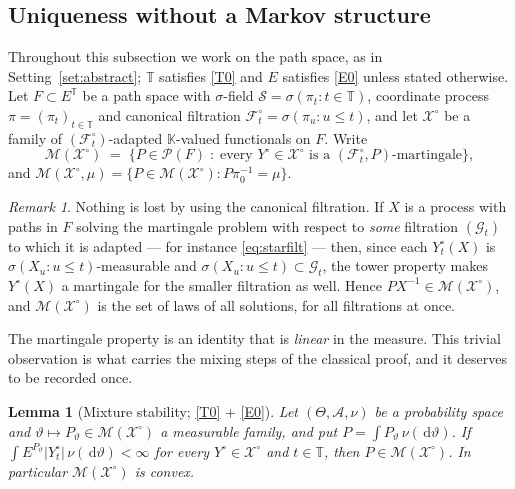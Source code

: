 \documentclass[11pt,a4paper]{article}
\theoremstyle{plain}
\newtheorem{lemma}[theorem]{Lemma}
\theoremstyle{definition}
\theoremstyle{remark}
\newtheorem{remark}[theorem]{Remark}
\newcommand{\T}{\mathbb{T}}                     %
\newcommand{\Prob}{\mathcal{P}}                %
\newcommand{\Filt}{\mathcal{F}}
\newcommand{\Gilt}{\mathcal{G}}
\newcommand{\K}{\mathbb{K}}
\newcommand{\XX}{\mathcal{X}}                  %
\newcommand{\Msol}{\mathcal{M}}
\newcommand{\dif}{\,\mathrm{d}}
\begin{document}
\subsection{Uniqueness without a Markov structure}
\label{ssec:absuniq}

Throughout this subsection we work on the path space, as in
Setting~\ref{set:abstract}; $\T$ satisfies \eqref{T0} and $E$ satisfies \eqref{E0} unless
stated otherwise.  Let $F \subset E^{\T}$ be a path space with $\sigma$-field
$\mathcal{S} = \sigma(\pi_t : t \in \T)$,
coordinate process $\pi = (\pi_t)_{t \in \T}$ and canonical filtration
$\Filt^\circ_t = \sigma(\pi_u : u \leq t)$, and let $\XX^\circ$ be a family of
$(\Filt^\circ_t)$-adapted $\K$-valued functionals on $F$.  Write
\[
  \Msol(\XX^\circ) \;=\; \bigl\{ P \in \Prob(F) \;:\;
    \text{every } Y^\circ \in \XX^\circ \text{ is a }
    (\Filt^\circ_t, P)\text{-martingale} \bigr\} ,
\]
and $\Msol(\XX^\circ,\mu) = \{P \in \Msol(\XX^\circ) : P \pi_0^{-1} = \mu\}$.

\begin{remark}
  \label{rem:filtirrelevant}
  Nothing is lost by using the canonical filtration.  If $X$ is a process with
  paths in $F$ solving the martingale problem with respect to \emph{some}
  filtration $(\Gilt_t)$ to which it is adapted --- for instance
  \eqref{eq:starfilt} --- then, since each $Y^\circ_t(X)$ is
  $\sigma(X_u : u \leq t)$-measurable and
  $\sigma(X_u : u \leq t) \subset \Gilt_t$, the tower property makes $Y^\circ(X)$
  a martingale for the smaller filtration as well.  Hence
  $P X^{-1} \in \Msol(\XX^\circ)$, and $\Msol(\XX^\circ)$ is the set of laws of
  all solutions, for all filtrations at once.
\end{remark}

The martingale property is an identity that is \emph{linear} in the measure.
This trivial observation is what carries the mixing steps of the classical proof,
and it deserves to be recorded once.

\begin{lemma}[Mixture stability; \eqref{T0} + \eqref{E0}]
  \label{lem:mixture}
  Let $(\Theta,\mathcal{A},\nu)$ be a probability space and
  $\vartheta \mapsto P_\vartheta \in \Msol(\XX^\circ)$ a measurable family, and
  put $P = \int P_\vartheta \, \nu(\dif\vartheta)$.  If
  $\int E^{P_\vartheta}|Y^\circ_t| \, \nu(\dif\vartheta) < \infty$ for every
  $Y^\circ \in \XX^\circ$ and $t \in \T$, then $P \in \Msol(\XX^\circ)$.  In
  particular $\Msol(\XX^\circ)$ is convex.
\end{lemma}
\end{document}
